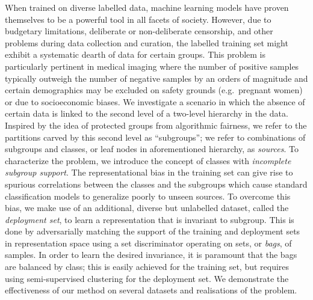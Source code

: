 \noindent
%
When trained on diverse labelled data, machine learning models have proven themselves to be a
powerful tool in all facets of society.
%
However, due to budgetary limitations, deliberate or non-deliberate censorship, and other problems
during data collection and curation, the labelled training set might exhibit a systematic dearth of
data for certain groups. This problem is particularly pertinent in medical imaging where the number
of positive samples typically outweigh the number of negative samples by an orders of magnitude and
certain demographics may be excluded on safety grounds (e.g.\ pregnant women) or due to
socioeconomic biases.
%
We investigate a scenario in which the absence of certain data is linked to the second level of a
two-level hierarchy in the data.
%
Inspired by the idea of protected groups from algorithmic fairness, we refer to the partitions
carved by this second level as ``subgroups''; we refer to combinations of subgroups and classes, or
leaf nodes in aforementioned hierarchy, as \emph{sources}.
%
To characterize the problem, we introduce the concept of classes with \emph{incomplete subgroup
support}. The representational bias in the training set can give rise to spurious correlations
between the classes and the subgroups which cause standard classification models to generalize
poorly to unseen sources.
%
To overcome this bias, we make use of an additional, diverse but unlabelled dataset, called the
\emph{deployment set}, to learn a representation that is invariant to subgroup. This is done by
adversarially matching the support of the training and deployment sets in representation space
using a set discriminator operating on sets, or \emph{bags}, of samples.
%
In order to learn the desired invariance, it is paramount that the bags are balanced by class; this
is easily achieved for the training set, but requires using semi-supervised clustering for the
deployment set.
%
We demonstrate the effectiveness of our method on several datasets and
realisations of the problem.
